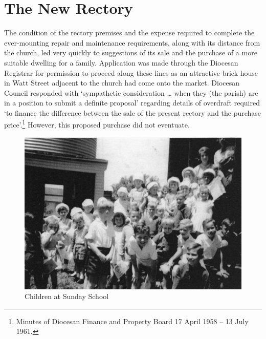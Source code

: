 \section{The New Rectory}



The condition of the rectory premises and the expense required to complete the ever-mounting repair and maintenance requirements, along with its distance from the church, led very quickly to suggestions of its sale and the purchase of a more suitable dwelling for a family. Application was made through the Diocesan Registrar for permission to proceed along these lines as an attractive brick house in Watt Street adjacent to the church had come onto the market. Diocesan Council responded with `sympathetic consideration \ldots{} when they (the parish) are in a position to submit a definite proposal' regarding details of overdraft required `to finance the difference between the sale of the present rectory and the purchase price'.\footnote{Minutes of Diocesan Finance and Property Board 17 April 1958 -- 13 July 1961.} However, this proposed purchase did not eventuate.








\begin{figure}[!htb]
\begin{center}
\includegraphics[width=1.\textwidth,center]{../images/sundaySchoolChildren.jpg}
\caption{Children at Sunday School}
\end{center}
\end{figure}




